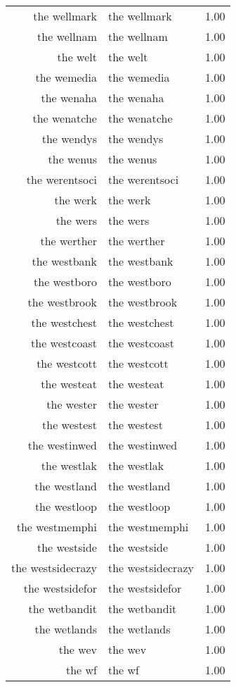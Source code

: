 \begin{table}[ht]
\begin{tabular}{rlr}
  the wellmark & the wellmark & 1.00 \\ 
  the wellnam & the wellnam & 1.00 \\ 
  the welt & the welt & 1.00 \\ 
  the wemedia & the wemedia & 1.00 \\ 
  the wenaha & the wenaha & 1.00 \\ 
  the wenatche & the wenatche & 1.00 \\ 
  the wendys & the wendys & 1.00 \\ 
  the wenus & the wenus & 1.00 \\ 
  the werentsoci & the werentsoci & 1.00 \\ 
  the werk & the werk & 1.00 \\ 
  the wers & the wers & 1.00 \\ 
  the werther & the werther & 1.00 \\ 
  the westbank & the westbank & 1.00 \\ 
  the westboro & the westboro & 1.00 \\ 
  the westbrook & the westbrook & 1.00 \\ 
  the westchest & the westchest & 1.00 \\ 
  the westcoast & the westcoast & 1.00 \\ 
  the westcott & the westcott & 1.00 \\ 
  the westeat & the westeat & 1.00 \\ 
  the wester & the wester & 1.00 \\ 
  the westest & the westest & 1.00 \\ 
  the westinwed & the westinwed & 1.00 \\ 
  the westlak & the westlak & 1.00 \\ 
  the westland & the westland & 1.00 \\ 
  the westloop & the westloop & 1.00 \\ 
  the westmemphi & the westmemphi & 1.00 \\ 
  the westside & the westside & 1.00 \\ 
  the westsidecrazy & the westsidecrazy & 1.00 \\ 
  the westsidefor & the westsidefor & 1.00 \\ 
  the wetbandit & the wetbandit & 1.00 \\ 
  the wetlands & the wetlands & 1.00 \\ 
  the wev & the wev & 1.00 \\ 
  the wf & the wf & 1.00 \\ 

\end{tabular}
\end{table}
